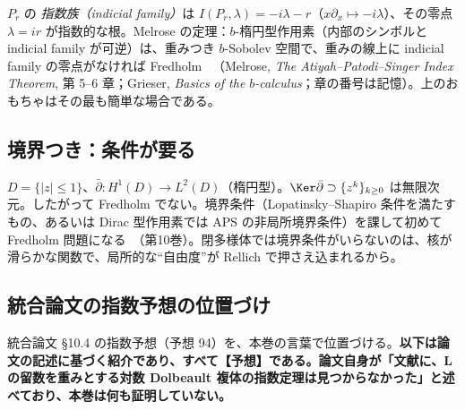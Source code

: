 \begin{center}
\end{center}
\begin{rem}[$b$-計算の標準的な言い方]
$P_r$ の \emph{指数族（indicial family）}は $I(P_r,\lambda)=-i\lambda-r$（$x\partial_x\mapsto-i\lambda$）、その零点 $\lambda=ir$ が指数的な根。Melrose の定理：$b$-楕円型作用素（内部のシンボルと indicial family が可逆）は、重みつき $b$-Sobolev 空間で、重みの線上に indicial family の零点がなければ Fredholm \tC\ （Melrose, \emph{The Atiyah--Patodi--Singer Index Theorem}, 第 5--6 章；Grieser, \emph{Basics of the $b$-calculus}；章の番号は記憶\tQ）。上のおもちゃはその最も簡単な場合である。
\end{rem}

\subsection{境界つき：条件が要る}
\begin{ex}\label{ex:disc}
$D=\{|z|\le1\}$、$\bar\partial:H^1(D)\to L^2(D)$（楕円型）。$\Ker\bar\partial\supset\{z^k\}_{k\ge0}$ は無限次元。したがって Fredholm でない。境界条件（Lopatinsky--Shapiro 条件を満たすもの、あるいは Dirac 型作用素では APS の非局所境界条件）を課して初めて Fredholm 問題になる\tC\ （第10巻）。閉多様体では境界条件がいらないのは、核が滑らかな関数で、局所的な``自由度''が Rellich で押さえ込まれるから。
\end{ex}

\subsection{統合論文の指数予想の位置づけ}\label{sec:conj}
統合論文 §10.4 の指数予想（予想 94）を、本巻の言葉で位置づける。\textbf{以下は論文の記述に基づく紹介であり、すべて【予想】である。論文自身が「文献に、L の留数を重みとする対数 Dolbeault 複体の指数定理は見つからなかった」と述べており、本巻は何も証明していない。}
